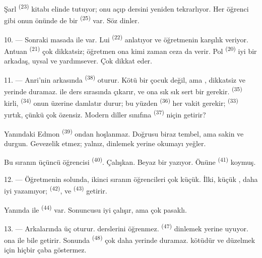 Şarl \textsuperscript{(23)} kitabı elinde tutuyor; onu açıp dersini yeniden
tekrarlıyor. Her öğrenci gibi onun önünde de bir 
\textsuperscript{(25)} var. Söz dinler.

10. --- Sonraki masada  ile  var. Lui
 \textsuperscript{(22)} anlatıyor ve öğretmenin
 karşılık veriyor. Antuan \textsuperscript{(21)} çok
dikkatsiz; öğretmen ona kimi zaman ceza da verir. Pol
\textsuperscript{(20)} iyi bir arkadaş, uysal ve yardımsever. Çok dikkat
eder.

\VUsaut{4.2mm}
\VUsaut{3.2mm}

11. --- Anri'nin arkasında  \textsuperscript{(38)} oturur. Kötü bir
çocuk değil, ama , dikkatsiz ve yerinde duramaz.
 ile  ders sırasında
 çıkarır, ve ona sık sık sert bir  gerekir.
 \textsuperscript{(35)} kirli, 
\textsuperscript{(34)} onun üzerine  damlatır durur;
bu yüzden  \textsuperscript{(36)} her vakit gerekir;
 \textsuperscript{(33)} yırtık, çünkü çok özensiz. Modern
diller sınıfına  \textsuperscript{(37)} niçin getirir?

Yanındaki Edmon \textsuperscript{(39)} ondan hoşlanmaz. Doğrusu biraz
tembel, ama sakin ve durgun. Gevezelik etmez; yalnız, dinlemek yerine
  okumayı yeğler.

Bu sıranın üçüncü öğrencisi  \textsuperscript{(40)}.
Çalışkan. Beyaz bir   yazıyor. Önüne
 \textsuperscript{(41)} koymuş.

12. --- Öğretmenin solunda, ikinci sıranın öğrencileri çok küçük. İlki,
küçük , daha iyi yazamıyor; 
\textsuperscript{(42)},  ve 
\textsuperscript{(43)} getirir.

Yanında  ile  \textsuperscript{(44)} var.
Sonuncusu iyi çalışır, ama  çok pasaklı.

13. --- Arkalarında üç  oturur.  derslerini
öğrenmez.  \textsuperscript{(47)} dinlemek yerine uyuyor.
 ona  ile  bile getirir. Sonunda
 \textsuperscript{(48)} çok daha yerinde duramaz.
 kötüdür ve düzelmek için hiçbir çaba göstermez.

